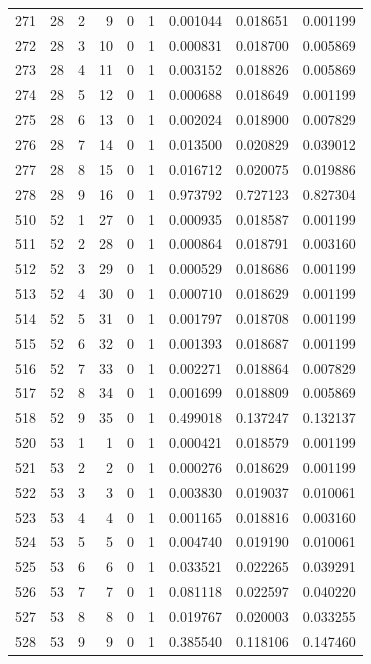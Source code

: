 \begin{longtable}{rrrrrrrrr}
271 & 28 & 2 & 9 & 0 & 1 & 0.001044 & 0.018651 & 0.001199 \\
272 & 28 & 3 & 10 & 0 & 1 & 0.000831 & 0.018700 & 0.005869 \\
273 & 28 & 4 & 11 & 0 & 1 & 0.003152 & 0.018826 & 0.005869 \\
274 & 28 & 5 & 12 & 0 & 1 & 0.000688 & 0.018649 & 0.001199 \\
275 & 28 & 6 & 13 & 0 & 1 & 0.002024 & 0.018900 & 0.007829 \\
276 & 28 & 7 & 14 & 0 & 1 & 0.013500 & 0.020829 & 0.039012 \\
277 & 28 & 8 & 15 & 0 & 1 & 0.016712 & 0.020075 & 0.019886 \\
278 & 28 & 9 & 16 & 0 & 1 & 0.973792 & 0.727123 & 0.827304 \\
510 & 52 & 1 & 27 & 0 & 1 & 0.000935 & 0.018587 & 0.001199 \\
511 & 52 & 2 & 28 & 0 & 1 & 0.000864 & 0.018791 & 0.003160 \\
512 & 52 & 3 & 29 & 0 & 1 & 0.000529 & 0.018686 & 0.001199 \\
513 & 52 & 4 & 30 & 0 & 1 & 0.000710 & 0.018629 & 0.001199 \\
514 & 52 & 5 & 31 & 0 & 1 & 0.001797 & 0.018708 & 0.001199 \\
515 & 52 & 6 & 32 & 0 & 1 & 0.001393 & 0.018687 & 0.001199 \\
516 & 52 & 7 & 33 & 0 & 1 & 0.002271 & 0.018864 & 0.007829 \\
517 & 52 & 8 & 34 & 0 & 1 & 0.001699 & 0.018809 & 0.005869 \\
518 & 52 & 9 & 35 & 0 & 1 & 0.499018 & 0.137247 & 0.132137 \\
520 & 53 & 1 & 1 & 0 & 1 & 0.000421 & 0.018579 & 0.001199 \\
521 & 53 & 2 & 2 & 0 & 1 & 0.000276 & 0.018629 & 0.001199 \\
522 & 53 & 3 & 3 & 0 & 1 & 0.003830 & 0.019037 & 0.010061 \\
523 & 53 & 4 & 4 & 0 & 1 & 0.001165 & 0.018816 & 0.003160 \\
524 & 53 & 5 & 5 & 0 & 1 & 0.004740 & 0.019190 & 0.010061 \\
525 & 53 & 6 & 6 & 0 & 1 & 0.033521 & 0.022265 & 0.039291 \\
526 & 53 & 7 & 7 & 0 & 1 & 0.081118 & 0.022597 & 0.040220 \\
527 & 53 & 8 & 8 & 0 & 1 & 0.019767 & 0.020003 & 0.033255 \\
528 & 53 & 9 & 9 & 0 & 1 & 0.385540 & 0.118106 & 0.147460 \\

\end{longtable}
